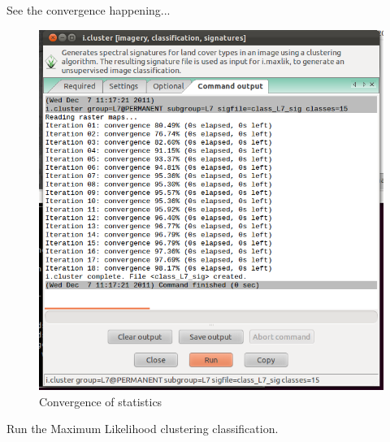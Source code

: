 See the convergence happening...

\begin{figure}[htbp]
   \centering
   \includegraphics[scale=0.35]{grass_rs010.png}
   \caption{Convergence of statistics}
   \label{fig:grass_rs010}
\end{figure}

Run the Maximum Likelihood clustering classification.

